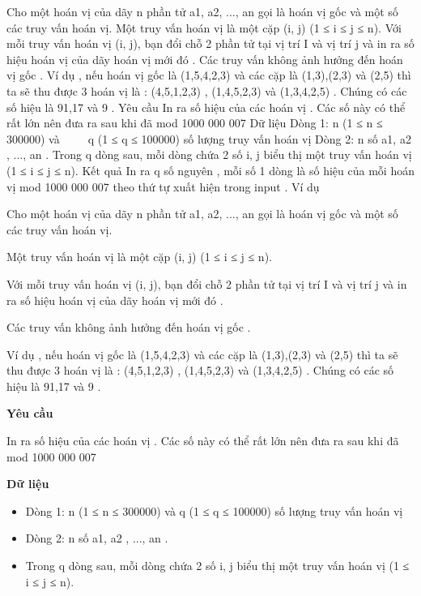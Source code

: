 



     Cho một hoán vị của dãy n phần tử a1, a2, ..., an gọi là hoán vị gốc và một số các truy vấn hoán vị.       Một truy vấn hoán vị là một cặp (i, j) (1 ≤ i ≤ j ≤ n).       Với mỗi truy vấn hoán vị (i, j), bạn đổi chỗ 2 phần tử tại vị trí I và vị trí j và in ra số hiệu hoán vị của dãy hoán vị mới đó .       Các truy vấn không ảnh hưởng đến hoán vị gốc .       Ví dụ , nếu hoán vị gốc là (1,5,4,2,3) và các cặp là (1,3),(2,3) và (2,5) thì ta sẽ thu được 3 hoán vị là : (4,5,1,2,3) , (1,4,5,2,3) và (1,3,4,2,5) . Chúng có các số hiệu là 91,17 và 9 .       Yêu cầu       In ra số hiệu của các hoán vị . Các số này có thể rất lớn nên đưa ra sau khi đã mod 1000 000 007       Dữ liệu       Dòng 1: n (1 ≤ n ≤ 300000) và      q (1 ≤ q ≤ 100000) số lượng truy vấn hoán vị       Dòng 2: n số a1, a2 , ..., an .       Trong q dòng sau, mỗi dòng chứa 2 số i, j biểu thị một truy vấn hoán vị (1 ≤ i ≤ j ≤ n).       Kết quả       In ra q số nguyên , mỗi số 1 dòng là số hiệu của mỗi hoán vị mod 1000 000 007 theo thứ tự xuất hiện trong input .       Ví dụ    

   Cho một hoán vị của dãy n phần tử a1, a2, ..., an gọi là hoán vị gốc và một số các truy vấn hoán vị.  

   Một truy vấn hoán vị là một cặp (i, j) (1 ≤ i ≤ j ≤ n).  

   Với mỗi truy vấn hoán vị (i, j), bạn đổi chỗ 2 phần tử tại vị trí I và vị trí j và in ra số hiệu hoán vị của dãy hoán vị mới đó .  

   Các truy vấn không ảnh hưởng đến hoán vị gốc .  



   Ví dụ , nếu hoán vị gốc là (1,5,4,2,3) và các cặp là (1,3),(2,3) và (2,5) thì ta sẽ thu được 3 hoán vị là : (4,5,1,2,3) , (1,4,5,2,3) và (1,3,4,2,5) . Chúng có các số hiệu là 91,17 và 9 .  





\textbf{    Yêu cầu   }

   In ra số hiệu của các hoán vị . Các số này có thể rất lớn nên đưa ra sau khi đã mod 1000 000 007  



\textbf{    Dữ liệu   }
\begin{itemize}
	\item     Dòng 1: n (1 ≤ n ≤ 300000) và q (1 ≤ q ≤ 100000) số lượng truy vấn hoán vị   
	\item     Dòng 2: n số a1, a2 , ..., an .   
	\item     Trong q dòng sau, mỗi dòng chứa 2 số i, j biểu thị một truy vấn hoán vị (1 ≤ i ≤ j ≤ n).   
\end{itemize}



